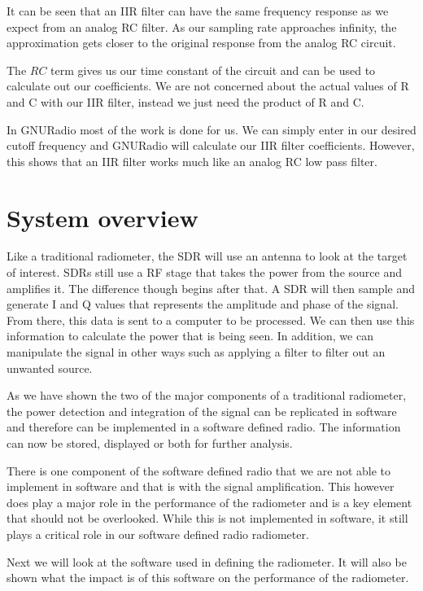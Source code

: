 It can be seen that an IIR filter can have the same frequency response as we expect from an analog RC filter.  As our sampling rate approaches infinity, the approximation gets closer to the original response from the analog RC circuit.  

The $RC$ term gives us our time constant of the circuit and can be used to calculate out our coefficients.  We are not concerned about the actual values of R and C with our IIR filter, instead we just need the product of R and C.  

In GNURadio most of the work is done for us.  We can simply enter in our desired cutoff frequency and GNURadio will calculate our IIR filter coefficients.  However, this shows that an IIR filter works much like an analog RC low pass filter.

\section{System overview}

Like a traditional radiometer, the SDR will use an antenna to look at the target of interest.  SDRs still use a RF stage that takes the power from the source and amplifies it.  The difference though begins after that.  A SDR will then sample and generate I and Q values that represents the amplitude and phase of the signal.  From there, this data is sent to a computer to be processed.  We can then use this information to calculate the power that is being seen.  In addition, we can manipulate the signal in other ways such as applying a filter to filter out an unwanted source.

As we have shown the two of the major components of a traditional radiometer, the power detection and integration of the signal can be replicated in software and therefore can be implemented in a software defined radio.  The information can now be stored, displayed or both for further analysis.  

There is one component of the software defined radio that we are not able to implement in software and that is with the signal amplification.  This however does play a major role in the performance of the radiometer and is a key element that should not be overlooked.  While this is not implemented in software, it still plays a critical role in our software defined radio radiometer. 

Next we will look at the software used in defining the radiometer.  It will also be shown what the impact is of this software on the performance of the radiometer.

